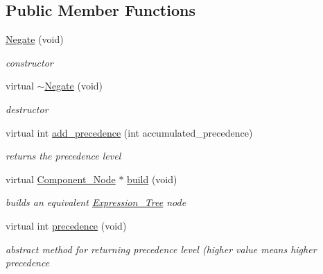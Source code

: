 \subsection*{Public Member Functions}
\begin{DoxyCompactItemize}
\item 
\hyperlink{classMadara_1_1Expression__Tree_1_1Negate_ad14403950c9a2f16f72f115bf82dab90}{Negate} (void)
\begin{DoxyCompactList}\small\item\em constructor \item\end{DoxyCompactList}\item 
virtual \hyperlink{classMadara_1_1Expression__Tree_1_1Negate_a961786e648135dcc323204c69e104c4e}{$\sim$Negate} (void)
\begin{DoxyCompactList}\small\item\em destructor \item\end{DoxyCompactList}\item 
virtual int \hyperlink{classMadara_1_1Expression__Tree_1_1Negate_aa96f02203b30b86ead5c20c309324626}{add\_\-precedence} (int accumulated\_\-precedence)
\begin{DoxyCompactList}\small\item\em returns the precedence level \item\end{DoxyCompactList}\item 
virtual \hyperlink{classMadara_1_1Expression__Tree_1_1Component__Node}{Component\_\-Node} $\ast$ \hyperlink{classMadara_1_1Expression__Tree_1_1Negate_acaac3cd5c4fbe26d0dff897707f021e5}{build} (void)
\begin{DoxyCompactList}\small\item\em builds an equivalent \hyperlink{classMadara_1_1Expression__Tree_1_1Expression__Tree}{Expression\_\-Tree} node \item\end{DoxyCompactList}\item 
virtual int \hyperlink{classMadara_1_1Expression__Tree_1_1Symbol_ac060dedb8d16864591b259df375109b3}{precedence} (void)
\begin{DoxyCompactList}\small\item\em abstract method for returning precedence level (higher value means higher precedence \item\end{DoxyCompactList}\end{DoxyCompactItemize}
